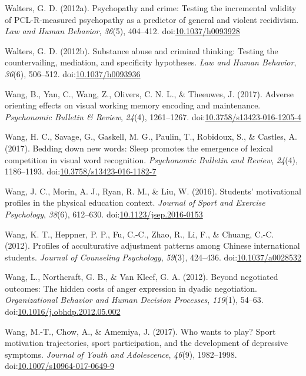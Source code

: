 \documentclass[english,man]{apa6}
\begin{document}
\hypertarget{ref-Walters2012}{}
Walters, G. D. (2012a). Psychopathy and crime: Testing the incremental
validity of PCL-R-measured psychopathy as a predictor of general and
violent recidivism. \emph{Law and Human Behavior}, \emph{36}(5),
404--412. doi:\href{https://doi.org/10.1037/h0093928}{10.1037/h0093928}

\hypertarget{ref-Walters2012a}{}
Walters, G. D. (2012b). Substance abuse and criminal thinking: Testing
the countervailing, mediation, and specificity hypotheses. \emph{Law and
Human Behavior}, \emph{36}(6), 506--512.
doi:\href{https://doi.org/10.1037/h0093936}{10.1037/h0093936}

\hypertarget{ref-Wang2016}{}
Wang, B., Yan, C., Wang, Z., Olivers, C. N. L., \& Theeuwes, J. (2017).
Adverse orienting effects on visual working memory encoding and
maintenance. \emph{Psychonomic Bulletin \& Review}, \emph{24}(4),
1261--1267.
doi:\href{https://doi.org/10.3758/s13423-016-1205-4}{10.3758/s13423-016-1205-4}

\hypertarget{ref-Wang2016a}{}
Wang, H. C., Savage, G., Gaskell, M. G., Paulin, T., Robidoux, S., \&
Castles, A. (2017). Bedding down new words: Sleep promotes the emergence
of lexical competition in visual word recognition. \emph{Psychonomic
Bulletin and Review}, \emph{24}(4), 1186--1193.
doi:\href{https://doi.org/10.3758/s13423-016-1182-7}{10.3758/s13423-016-1182-7}

\hypertarget{ref-Wang2016b}{}
Wang, J. C., Morin, A. J., Ryan, R. M., \& Liu, W. (2016). Students'
motivational profiles in the physical education context. \emph{Journal
of Sport and Exercise Psychology}, \emph{38}(6), 612--630.
doi:\href{https://doi.org/10.1123/jsep.2016-0153}{10.1123/jsep.2016-0153}

\hypertarget{ref-Wang2012a}{}
Wang, K. T., Heppner, P. P., Fu, C.-C., Zhao, R., Li, F., \& Chuang,
C.-C. (2012). Profiles of acculturative adjustment patterns among
Chinese international students. \emph{Journal of Counseling Psychology},
\emph{59}(3), 424--436.
doi:\href{https://doi.org/10.1037/a0028532}{10.1037/a0028532}

\hypertarget{ref-Wang2012b}{}
Wang, L., Northcraft, G. B., \& Van Kleef, G. A. (2012). Beyond
negotiated outcomes: The hidden costs of anger expression in dyadic
negotiation. \emph{Organizational Behavior and Human Decision
Processes}, \emph{119}(1), 54--63.
doi:\href{https://doi.org/10.1016/j.obhdp.2012.05.002}{10.1016/j.obhdp.2012.05.002}

\hypertarget{ref-Wang2017}{}
Wang, M.-T., Chow, A., \& Amemiya, J. (2017). Who wants to play? Sport
motivation trajectories, sport participation, and the development of
depressive symptoms. \emph{Journal of Youth and Adolescence},
\emph{46}(9), 1982--1998.
doi:\href{https://doi.org/10.1007/s10964-017-0649-9}{10.1007/s10964-017-0649-9}
\end{document}
